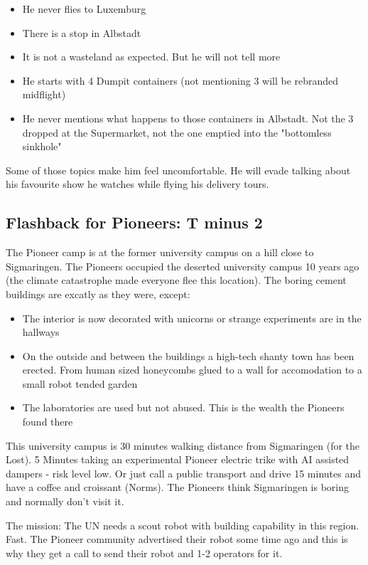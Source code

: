 \begin{itemize}
    \item He never flies to Luxemburg
    \item There is a stop in Albstadt
    \item It is not a wasteland as expected. But he will not tell more
    \item He starts with 4 Dumpit containers (not mentioning 3 will be rebranded midflight)
    \item He never mentions what happens to those containers in Albstadt. Not the 3 dropped at the Supermarket, not the one emptied into the "bottomless sinkhole"
\end{itemize}

Some of those topics make him feel uncomfortable. He will evade talking about his favourite show he watches while flying his delivery tours.


\subsection{Flashback for Pioneers: T minus 2}

The Pioneer camp is at the former university campus on a hill close to Sigmaringen. The Pioneers occupied the deserted university campus 10 years ago (the climate catastrophe made everyone flee this location). The boring cement buildings are excatly as they were, except:

\begin{itemize}
    \item The interior is now decorated with unicorns or strange experiments are in the hallways
    \item On the outside and between the buildings a high-tech shanty town has been erected. From human sized honeycombs glued to a wall for accomodation to a small robot tended garden
    \item The laboratories are used but not abused. This is the wealth the Pioneers found there
\end{itemize}

This university campus is 30 minutes walking distance from Sigmaringen (for the Lost). 5 Minutes taking an experimental Pioneer electric trike with AI assisted dampers - risk level low. Or just call a public transport and drive 15 minutes and have a coffee and croissant (Norms).
The Pioneers think Sigmaringen is boring and normally don't visit it.

The mission: The UN needs a scout robot with building capability in this region. Fast. The Pioneer community advertised their robot some time ago and this is why they get a call to send their robot and 1-2 operators for it.

